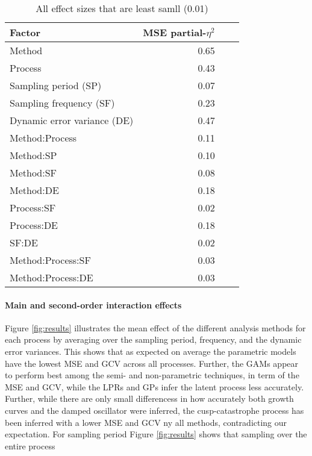 \documentclass[man, floatsintext]{apa7}
\begin{document}
\begin{table}[htbp]
  \vspace*{2em}
  \begin{threeparttable}
    \caption{All effect sizes that are least samll (0.01)}
    \label{tab:peta}
    \begin{tabular}{@{}lrrr@{}} \toprule
      Factor                      & MSE partial-$\eta^2$ \\ \midrule
      Method                      & 0.65                 \\
      Process                     & 0.43                 \\
      Sampling period (SP)        & 0.07                 \\
      Sampling frequency (SF)     & 0.23                 \\
      Dynamic error variance (DE) & 0.47                 \\
      Method:Process              & 0.11                 \\
      Method:SP                   & 0.10                 \\
      Method:SF                   & 0.08                 \\
      Method:DE                   & 0.18                 \\
      Process:SF                  & 0.02                 \\
      Process:DE                  & 0.18                 \\
      SF:DE                       & 0.02                 \\
      Method:Process:SF           & 0.03                 \\
      Method:Process:DE           & 0.03                 \\ \midrule
    \end{tabular}
  \end{threeparttable}
\end{table}

\paragraph{Main and second-order interaction effects}

Figure \ref{fig:results} illustrates the mean effect of the different analysis
methods for each process by averaging over the sampling period, frequency,
and the dynamic error variances. This shows that as expected on average
the parametric models have the lowest MSE and GCV across all processes.
Further, the GAMs appear to perform best among the semi- and non-parametric
techniques, in term of the MSE and GCV, while the LPRs and GPs infer the latent
process less accurately. Further, while there are only small differencess
in how accurately both growth curves and the damped oscillator were inferred,
the cusp-catastrophe process has been inferred with a lower MSE and GCV ny all
methods, contradicting our expectation. For sampling period Figure
\ref{fig:results} shows that sampling over the entire process
\end{document}
